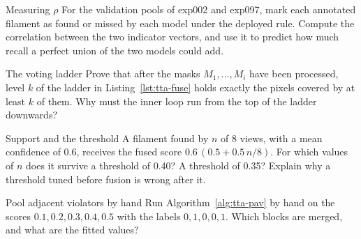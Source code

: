 \begin{exercise}{Measuring $\rho$}\label{ex:tta-rho}
For the validation pools of exp002 and exp097, mark each annotated filament as found or missed by each
model under the deployed rule. Compute the correlation between the two indicator vectors, and use it
to predict how much recall a perfect union of the two models could add.
\end{exercise}

\begin{exercise}{The voting ladder}
Prove that after the masks $M_1,\dots,M_i$ have been processed, level $k$ of the ladder in
Listing~\ref{lst:tta-fuse} holds exactly the pixels covered by at least $k$ of them. Why must the
inner loop run from the top of the ladder downwards?
\end{exercise}

\begin{exercise}{Support and the threshold}
A filament found by $n$ of 8 views, with a mean confidence of 0.6, receives the fused score
$0.6\,(0.5+0.5\,n/8)$. For which values of $n$ does it survive a threshold of 0.40? A threshold of
0.35? Explain why a threshold tuned before fusion is wrong after it.
\end{exercise}

\begin{exercise}{Pool adjacent violators by hand}
Run Algorithm~\ref{alg:tta-pav} by hand on the scores $0.1, 0.2, 0.3, 0.4, 0.5$ with the labels
$0, 1, 0, 0, 1$. Which blocks are merged, and what are the fitted values?
\end{exercise}
